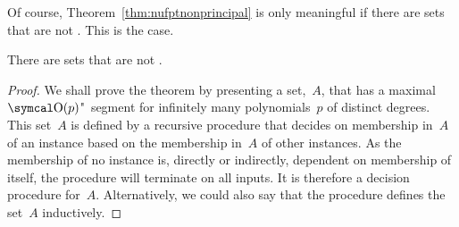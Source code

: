 Of course, Theorem~\ref{thm:nufptnonprincipal} is only meaningful if there are  sets that are not .
This is the case.
\begin{theorem}
  There are  sets that are not .
\end{theorem}
\begin{proof}
  We shall prove the theorem by presenting a  set,~$A$, that has a maximal $\bigO(p)$"~segment for infinitely many polynomials~$p$ of distinct degrees.
  This set~$A$ is defined by a recursive procedure that decides on membership in~$A$ of an instance based on the membership in~$A$ of other instances.
  As the membership of no instance is, directly or indirectly, dependent on membership of itself, the procedure will terminate on all inputs.
  It is therefore a decision procedure for~$A$.
  Alternatively, we could also say that the procedure defines the set~$A$ inductively.


\end{proof}
